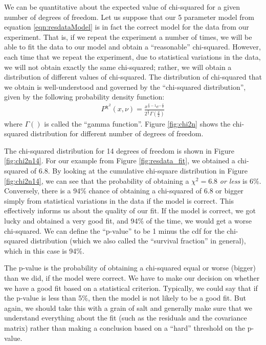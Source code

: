 We can be quantitative about the expected value of chi-squared for a given number of degrees of freedom. Let us suppose that our 5 parameter model from equation \ref{eqn:resdataModel} is in fact the correct model for the data from our experiment. That is, if we repeat the experiment a number of times, we will be able to fit the data to our model and obtain a ``reasonable'' chi-squared. However, each time that we repeat the experiment, due to statistical variations in the data, we will not obtain exactly the same chi-squared; rather, we will obtain a distribution of different values of chi-squared. The distribution of chi-squared that we obtain is well-understood and governed by the ``chi-squared distribution'', given by the following probability density function:
\begin{align}
P^{\chi^2}(x,\nu)=\frac{x^{\frac{\nu}{2}-1}e^{-\frac{x}{2}}}{2^{\frac{\nu}{2}}\Gamma\left(\frac{\nu}{2}\right)}
\end{align}
where $\Gamma()$ is called the ``gamma function''. Figure \ref{fig:chi2n} shows the chi-squared distribution for different number of degrees of freedom.

The chi-squared distribution for 14 degrees of freedom is shown in Figure \ref{fig:chi2n14}. For our example from Figure \ref{fig:resdata_fit}, we obtained a chi-squared of 6.8. By looking at the cumulative chi-square distribution in Figure \ref{fig:chi2n14}, we can see that the probability of obtaining a $\chi^2=6.8$ \textit{or less} is 6\%. Conversely, there is a 94\% chance of obtaining a chi-squared of 6.8 or bigger simply from statistical variations in the data if the model is correct. This effectively informs us about the quality of our fit. If the model is correct, we got lucky and obtained a very good fit, and 94\% of the time, we would get a worse chi-squared. We can define the ``p-value'' to be 1 minus the cdf for the chi-squared distribution (which we also called the ``survival fraction'' in general), which in this case is 94\%.

The p-value is the probability of obtaining a chi-squared equal or worse (bigger) than we did, if the model were correct. We have to make our decision on whether we have a good fit based on a statistical criterion. Typically, we could say that if the p-value is less than 5\%, then the model is not likely to be a good fit. But again, we should take this with a grain of salt and generally make sure that we understand everything about the fit (such as the residuals and the covariance matrix) rather than making a conclusion based on a ``hard'' threshold on the p-value.

